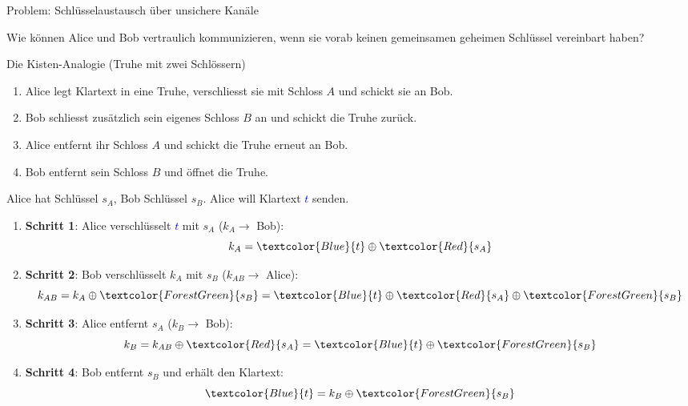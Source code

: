 \begin{frame}{Problem: Schlüsselaustausch über unsichere Kanäle}
	\begin{myidea}
		Wie können Alice und Bob vertraulich kommunizieren, wenn sie vorab keinen gemeinsamen geheimen Schlüssel vereinbart haben?
	\end{myidea}
	
	\pause
	\vspace{0.2cm}
	\begin{block}{Die Kisten-Analogie (Truhe mit zwei Schlössern)}
		{\small
		\begin{enumerate}[<+->]
			\item Alice legt Klartext in eine Truhe, verschliesst sie mit Schloss $A$ und schickt sie an Bob.
			\item Bob schliesst zusätzlich sein eigenes Schloss $B$ an und schickt die Truhe zurück.
			\item Alice entfernt ihr Schloss $A$ und schickt die Truhe erneut an Bob.
			\item Bob entfernt sein Schloss $B$ und öffnet die Truhe.
		\end{enumerate}
		}
	\end{block}
\end{frame}

\begin{frame}
	\begin{myprocedure}
		{\small
		Alice hat Schlüssel $s_A$, Bob Schlüssel $s_B$. Alice will Klartext \textcolor{Blue}{$t$} senden.
		
		\begin{enumerate}[<+->]
			\item \textbf{Schritt 1}: Alice verschlüsselt \textcolor{Blue}{$t$} mit $s_A$ ($k_A \rightarrow$ Bob):
			      \[ k_A = \textcolor{Blue}{t} \oplus \textcolor{Red}{s_A} \]
			\item \textbf{Schritt 2}: Bob verschlüsselt $k_A$ mit $s_B$ ($k_{AB} \rightarrow$ Alice):
			      \[ k_{AB} = k_A \oplus \textcolor{ForestGreen}{s_B} = \textcolor{Blue}{t} \oplus \textcolor{Red}{s_A} \oplus \textcolor{ForestGreen}{s_B} \]
			\item \textbf{Schritt 3}: Alice entfernt $s_A$ ($k_B \rightarrow$ Bob):
			      \[ k_B = k_{AB} \oplus \textcolor{Red}{s_A} = \textcolor{Blue}{t} \oplus \textcolor{ForestGreen}{s_B} \]
			\item \textbf{Schritt 4}: Bob entfernt $s_B$ und erhält den Klartext:
			      \[ \textcolor{Blue}{t} = k_B \oplus \textcolor{ForestGreen}{s_B} \]
		\end{enumerate}
		}
	\end{myprocedure}
\end{frame}


